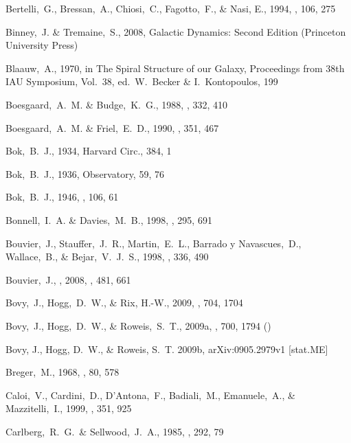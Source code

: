\begin{thebibliography}{99}
  Bertelli,~G., Bressan,~A., Chiosi,~C., Fagotto,~F., \& Nasi, E., 1994,
  \aaps, 106, 275

  Binney,~J. \& Tremaine,~S., 2008, Galactic Dynamics: Second Edition
  (Princeton University Press)

  Blaauw,~A., 1970, in The Spiral Structure of our Galaxy, Proceedings from 38th IAU Symposium, Vol.~38, ed.~W.~Becker \& I.~Kontopoulos, 199

  Boesgaard,~A.~M. \& Budge,~K.~G., 1988,
  \apj, 332, 410

  Boesgaard,~A.~M. \& Friel,~E.~D., 1990,
  \apj, 351, 467

  Bok,~B.~J., 1934,
  Harvard Circ., 384, 1

  Bok,~B.~J., 1936,
  Observatory, 59, 76

  Bok,~B.~J., 1946,
  \mnras, 106, 61

  Bonnell,~I.~A. \& Davies,~M.~B., 1998,
  \mnras, 295, 691

  Bouvier,~J., Stauffer,~J.~R., Martin,~E.~L., Barrado y Navascues,~D., Wallace,~B., \& Bejar,~V.~J.~S., 1998,
  \aap, 336, 490

  Bouvier,~J., \etal, 2008,
  \aap, 481, 661

  Bovy,~J., Hogg,~D.~W., \& Rix, H.-W., 2009,
  \apj, 704, 1704

 Bovy,~J., Hogg,~D.~W.,
  \& Roweis,~S.~T., 2009a, \apj, 700, 1794 (\bhr)

{Bovy}, J., {Hogg}, D.~W., \& {Roweis}, S.~T. 2009b, {arXiv:0905.2979v1
[stat.ME]}

  Breger,~M., 1968, \pasp, 80, 578

  Caloi,~V., Cardini,~D., D'Antona,~F., Badiali,~M., Emanuele,~A., \& Mazzitelli,~I., 1999,
  \aap, 351, 925

  Carlberg,~R.~G.~\& Sellwood,~J.~A., 1985,
  \apj, 292, 79


\end{thebibliography}
